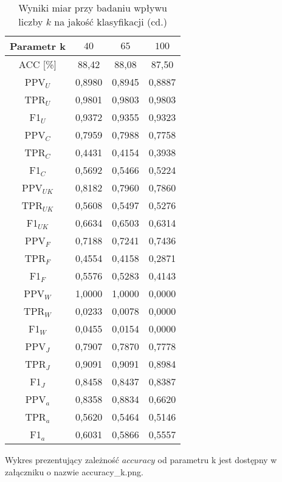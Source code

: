 \documentclass{article}
\begin{document}
\begin{table}[H]
    \centering
    \begin{tabular}{|c|c|c|c|}
    \hline
    \textbf{Parametr k} & \textbf{\(40\)} & \textbf{\(65\)} & \textbf{\(100\)}  \\ \hline
    ACC [\%] & 88,42 & 88,08 & 87,50 \\ \hline
    PPV\(_U\) & 0,8980 & 0,8945 & 0,8887 \\ \hline
    TPR\(_U\) & 0,9801 & 0,9803 & 0,9803 \\ \hline
    F1\(_U\) & 0,9372 & 0,9355 & 0,9323 \\ \hline
    PPV\(_C\) & 0,7959 & 0,7988 & 0,7758 \\ \hline
    TPR\(_C\) & 0,4431 & 0,4154 & 0,3938 \\ \hline
    F1\(_C\) & 0,5692 & 0,5466 & 0,5224 \\ \hline
    PPV\(_{UK}\) & 0,8182 & 0,7960 & 0,7860 \\ \hline
    TPR\(_{UK}\) & 0,5608 & 0,5497 & 0,5276 \\ \hline
    F1\(_{UK}\) & 0,6634 & 0,6503 & 0,6314 \\ \hline
    PPV\(_F\) & 0,7188 & 0,7241 & 0,7436\\ \hline
    TPR\(_F\) & 0,4554 & 0,4158 & 0,2871\\ \hline
    F1\(_F\) & 0,5576 & 0,5283 & 0,4143\\ \hline
    PPV\(_W\) & 1,0000 & 1,0000 & 0,0000 \\ \hline
    TPR\(_W\) & 0,0233 & 0,0078 & 0,0000 \\ \hline
    F1\(_W\) & 0,0455 & 0,0154 & 0,0000 \\ \hline
    PPV\(_J\) & 0,7907 & 0,7870 & 0,7778 \\ \hline
    TPR\(_J\) & 0,9091 & 0,9091 & 0,8984 \\ \hline
    F1\(_J\) & 0,8458 & 0,8437 & 0,8387 \\ \hline
    PPV\(_a\) & 0,8358 & 0,8834 & 0,6620 \\ \hline
    TPR\(_a\) & 0,5620 & 0,5464 & 0,5146 \\ \hline
    F1\(_a\) & 0,6031 & 0,5866 & 0,5557\\ \hline
    \end{tabular}
    \caption{Wyniki miar przy badaniu wpływu liczby \(k\) na jakość klasyfikacji (cd.)}
\end{table}

Wykres prezentujący zależność \(accuracy\) od parametru k jest dostępny w załączniku o nazwie accuracy\_k.png.
\end{document}
